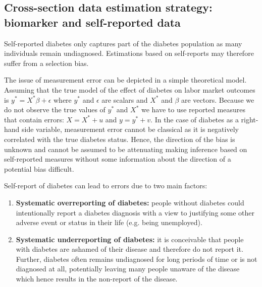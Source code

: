 \documentclass[12pt,english,british]{article}
\begin{document}
\subsection{Cross-section data estimation strategy: biomarker and self-reported data}

Self-reported diabetes only captures part of the diabetes population as many individuals remain undiagnosed.  Estimations based on self-reports may therefore suffer from a selection bias.

The issue of measurement error can be depicted in a simple theoretical model. Assuming that the true model of the effect of diabetes on labor market outcomes is $y^{*}=X^{*}\beta+\epsilon$ where $y^{*}$ and $\epsilon$ are scalars and $X^{*}$ and $\beta$ are vectors. Because we do not observe the true values of $y^{*}$ and $X^{*}$  we have to use reported measures that contain errors: $X=X^{*} + u$ and $y=y^{*} + v$. In the case of diabetes as a right-hand side variable, measurement error cannot be classical as it is negatively correlated with the true diabetes status. Hence, the direction of the bias is unknown and cannot be assumed to be attenuating making inference based on self-reported measures without some information about the direction of a potential bias difficult.

Self-report of diabetes can lead to errors due to two main factors: 
\begin{enumerate}
\item \textbf{Systematic overreporting of diabetes:} people without diabetes
could intentionally report a diabetes diagnosis with a view to justifying
some other adverse event or status in their life (e.g. being unemployed). 
\item \textbf{Systematic underreporting of diabetes:} it is conceivable
that people with diabetes are ashamed of their disease and therefore
do not report it. Further, diabetes often remains
undiagnosed for long periods of time or is not diagnosed at all, potentially
leaving many people unaware of the disease which hence results in
the non-report of the disease.
\end{enumerate} 
\end{document}
